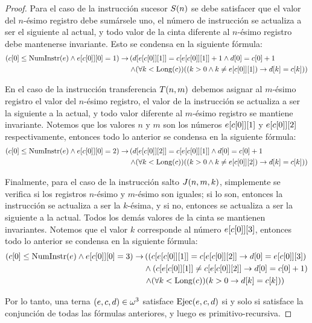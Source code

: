 \begin{proof}
	Para el caso de la instrucción sucesor $S\pa*{n}$ se debe satisfacer que el valor del $n$-ésimo registro debe sumársele uno, el número de instrucción se actualiza a ser el siguiente al actual, y todo valor de la cinta diferente al $n$-ésimo registro debe mantenerse invariante. Esto se condensa en la siguiente fórmula:
	\begin{align*}
		\pa*{c\bra*{0}\leq\NUMINSTRUCCIONES\pa*{e}\land e\bra*{c\bra*{0}}\bra*{0} = 1}\to&\left(d\bra*{e\bra*{c\bra*{0}}\bra*{1}} = c\bra*{e\bra*{c\bra*{0}}\bra*{1}} + 1\land d\bra*{0} = c\bra*{0} + 1\right.\\
		&\left.\land\pa*{\forall k <\LONGITUD\pa*{c}}\pa*{\pa*{k > 0\land k\neq e\bra*{c\bra*{0}}\bra*{1}}\to d\bra*{k} = c\bra*{k}}\right)
	\end{align*}

	En el caso de la instrucción transferencia $T\pa*{n, m}$ debemos asignar al $m$-ésimo registro el valor del $n$-ésimo registro, el valor de la instrucción se actualiza a ser la siguiente a la actual, y todo valor diferente al $m$-ésimo registro se mantiene invariante. Notemos que los valores $n$ y $m$ son los números $e\bra*{c\bra*{0}}\bra*{1}$ y $e\bra*{c\bra*{0}}\bra*{2}$ respectivamente, entonces todo lo anterior se condensa en la siguiente fórmula:
	\begin{align*}
		\pa*{c\bra*{0}\leq\NUMINSTRUCCIONES\pa*{e}\land e\bra*{c\bra*{0}}\bra*{0} = 2}\to&\left(d\bra*{e\bra*{c\bra*{0}}\bra*{2}} = c\bra*{e\bra*{c\bra*{0}}\bra*{1}}\land d\bra*{0} = c\bra*{0} + 1\right.\\
		&\left.\land\pa*{\forall k <\LONGITUD\pa*{c}}\pa*{\pa*{k > 0\land k\neq e\bra*{c\bra*{0}}\bra*{2}}\to d\bra*{k} = c\bra*{k}}\right)
	\end{align*}

	Finalmente, para el caso de la instrucción salto $J\pa*{n, m, k}$, simplemente se verifica si los registros $n$-ésimo y $m$-ésimo son iguales; si lo son, entonces la instrucción se actualiza a ser la $k$-ésima, y si no, entonces se actualiza a ser la siguiente a la actual. Todos los demás valores de la cinta se mantienen invariantes. Notemos que el valor $k$ corresponde al número $e\bra*{c\bra*{0}}\bra*{3}$, entonces todo lo anterior se condensa en la siguiente fórmula:
	\begin{align*}
		\pa*{c\bra*{0}\leq\NUMINSTRUCCIONES\pa*{e}\land e\bra*{c\bra*{0}}\bra*{0} = 3}\to&\left(\pa*{c\bra*{e\bra*{c\bra*{0}}\bra*{1}} =c\bra*{e\bra*{c\bra*{0}}\bra*{2}}\to d\bra*{0} = e\bra*{c\bra*{0}}\bra*{3}}\right.\\
		&\land\pa*{c\bra*{e\bra*{c\bra*{0}}\bra*{1}}\neq c\bra*{e\bra*{c\bra*{0}}\bra*{2}}\to d\bra*{0} = c\bra*{0} + 1}\\
		&\left.\land\pa*{\forall k <\LONGITUD\pa*{c}}\pa*{k > 0\to d\bra*{k} = c\bra*{k}}\right)
	\end{align*}

	Por lo tanto, una terna $\pa*{e, c, d}\in\omega^{3}$ satisface $\EJECUCION\pa*{e, c, d}$ si y solo si satisface la conjunción de todas las fórmulas anteriores, y luego es primitivo-recursiva.
\end{proof}

